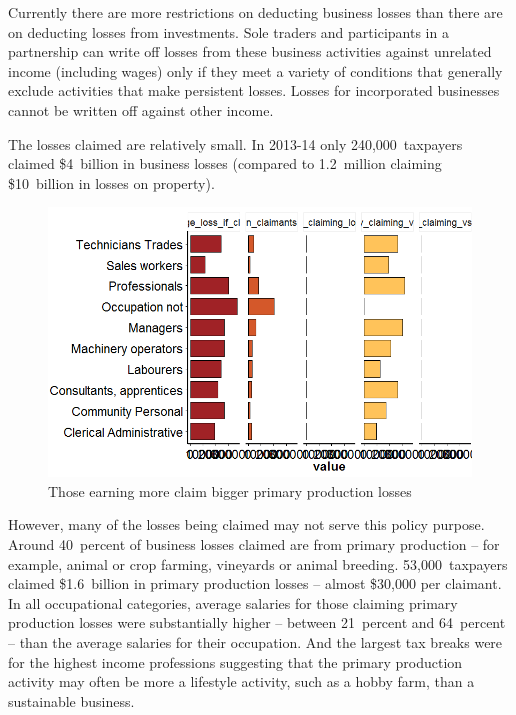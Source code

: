 \documentclass{grattan}\usepackage[]{graphicx}\usepackage[]{color}
\begin{document}
Currently there are more restrictions on deducting business losses than there are on deducting losses from investments. Sole traders and participants in a partnership can write off losses from these business activities against unrelated income (including wages) only if they meet a variety of conditions that generally exclude activities that make persistent losses.  Losses for incorporated businesses cannot be written off against other income. 





The losses claimed are relatively small. In 2013-14 only 240,000~taxpayers claimed \$4~billion in business losses (compared to 1.2~million claiming \$10~billion in losses on property).

\TBD{\dots}



\begin{figure}
\caption{Those earning more claim bigger primary production losses}

\includegraphics[width=\columnwidth]{CGT-NG-atlas//PP-losses-by-occ-1}
\end{figure}

However, many of the losses being claimed may not serve this policy purpose. Around 40~percent of business losses claimed are from primary production -- for example, animal or crop farming, vineyards or animal breeding. 53,000~taxpayers claimed \$1.6~billion  in primary production losses -- almost \$30,000 per claimant. In all occupational categories, average salaries for those claiming primary production losses were substantially higher -- between 21~percent and 64~percent -- than the average salaries for their occupation. And the largest tax breaks were for the highest income professions  suggesting that the primary production activity may often be more a lifestyle activity, such as a hobby farm, than a sustainable business. 
\end{document}
